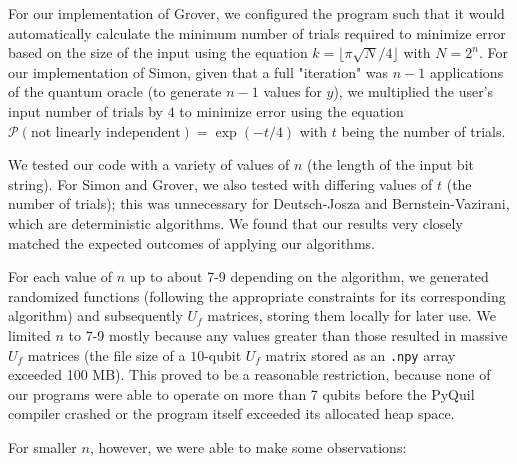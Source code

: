 \documentclass[12pt]{article}
\begin{document}
For our implementation of Grover, we configured the program such that it would automatically calculate the minimum number of trials required to minimize error based on the size of the input using the equation $k = \lfloor\pi\sqrt{N}/4\rfloor$ with $N = 2^n$. For our implementation of Simon, given that a full "iteration" was $n-1$ applications of the quantum oracle (to generate $n-1$ values for $y$), we multiplied the user's input number of trials by $4$ to minimize error using the equation $\mathcal{P}(\text{not linearly independent}) = \exp(-t/4)$ with $t$ being the number of trials.

We tested our code with a variety of values of $n$ (the length of the input bit string).
For Simon and Grover, we also tested with differing values of $t$ (the number of trials); this was unnecessary for Deutsch-Josza and Bernstein-Vazirani, which are deterministic algorithms.
We found that our results very closely matched the expected outcomes of applying our algorithms.

For each value of $n$ up to about 7-9 depending on the algorithm, we generated randomized functions (following the appropriate constraints for its corresponding algorithm) and subsequently $U_f$ matrices, storing them locally for later use.
We limited $n$ to 7-9 mostly because any values greater than those resulted in massive $U_f$ matrices (the file size of a $10$-qubit $U_f$ matrix stored as an \texttt{.npy} array exceeded 100 MB).
This proved to be a reasonable restriction, because none of our programs were able to operate on more than 7 qubits before the PyQuil compiler crashed or the program itself exceeded its allocated heap space.

For smaller $n$, however, we were able to make some observations:
\end{document}
